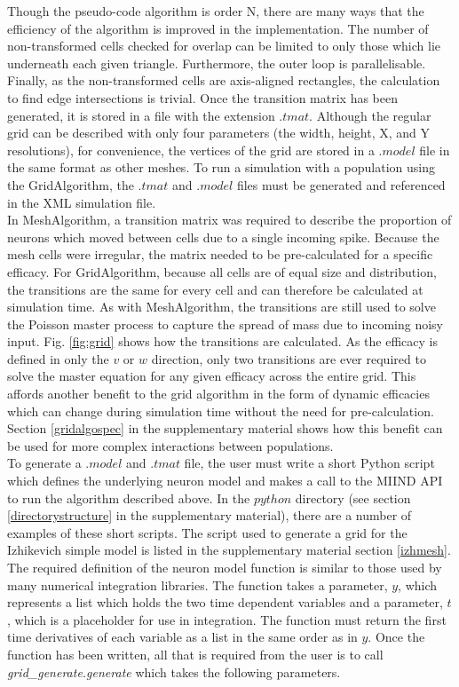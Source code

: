 \documentclass[utf8]{frontiersSCNS} %
\begin{document}
Though the pseudo-code algorithm is order N\texttwosuperior, there are many ways that the efficiency of the algorithm is improved in the implementation. The number of non-transformed cells checked for overlap can be limited to only those which lie underneath each given triangle. Furthermore, the outer loop is parallelisable. Finally, as the non-transformed cells are axis-aligned rectangles, the calculation to find edge intersections is trivial. Once the transition matrix has been generated, it is stored in a file with the extension $.tmat$. Although the regular grid can be described with only four parameters (the width, height, X, and Y resolutions), for convenience, the vertices of the grid are stored in a $.model$ file in the same format as other meshes. To run a simulation with a population using the GridAlgorithm, the $.tmat$ and $.model$ files must be generated and referenced in the XML simulation file.\\

In MeshAlgorithm, a transition matrix was required to describe the proportion of neurons which moved between cells due to a single incoming spike. Because the mesh cells were irregular, the matrix needed to be pre-calculated for a specific efficacy. For GridAlgorithm, because all cells are of equal size and distribution, the transitions are the same for every cell and can therefore be calculated at simulation time. As with MeshAlgorithm, the transitions are still used to solve the Poisson master process to capture the spread of mass due to incoming noisy input. Fig. \ref{fig:grid} shows how the transitions are calculated. As the efficacy is defined in only the $v$ or $w$ direction, only two transitions are ever required to solve the master equation for any given efficacy across the entire grid. This affords another benefit to the grid algorithm in the form of dynamic efficacies which can change during simulation time without the need for pre-calculation. Section \ref{gridalgospec} in the supplementary material shows how this benefit can be used for more complex interactions between populations.\\

To generate a $.model$ and $.tmat$ file, the user must write a short Python script which defines the underlying neuron model and makes a call to the MIIND API to run the algorithm described above. In the $python$ directory (see section \ref{directorystructure} in the supplementary material), there are a number of examples of these short scripts. The script used to generate a grid for the Izhikevich simple model is listed in the supplementary material section \ref{izhmesh}. The required definition of the neuron model function is similar to those used by many numerical integration libraries. The function takes a parameter, $y$, which represents a list which holds the two time dependent variables and a parameter, $t$, which is a placeholder for use in integration. The function must return the first time derivatives of each variable as a list in the same order as in $y$. Once the function has been written, all that is required from the user is to call \textit{grid\_generate.generate} which takes the following parameters. 
\end{document}
